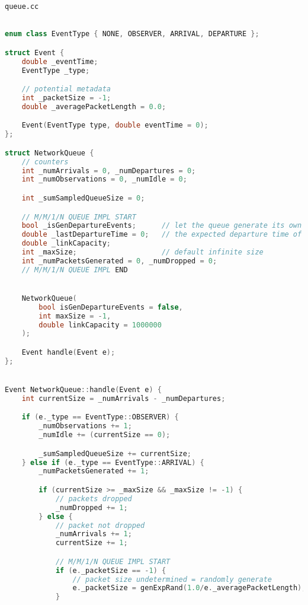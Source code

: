 \documentclass{article}
\begin{document}
\newpage

\texttt{queue.cc}
\begin{lstlisting}[language=C++,
                   directivestyle={\color{black}}
                   emph={int,char,double,float,unsigned},
                   emphstyle={\color{blue}}
                  ]

enum class EventType { NONE, OBSERVER, ARRIVAL, DEPARTURE };

struct Event {
    double _eventTime;
    EventType _type;

    // potential metadata
    int _packetSize = -1;
    double _averagePacketLength = 0.0;

    Event(EventType type, double eventTime = 0);
};

struct NetworkQueue {
    // counters
    int _numArrivals = 0, _numDepartures = 0;
    int _numObservations = 0, _numIdle = 0;

    int _sumSampledQueueSize = 0;

    // M/M/1/N QUEUE IMPL START
    bool _isGenDepartureEvents;      // let the queue generate its own departure events
    double _lastDepartureTime = 0;   // the expected departure time of the last packet in q
    double _linkCapacity;
    int _maxSize;                    // default infinite size
    int _numPacketsGenerated = 0, _numDropped = 0;
    // M/M/1/N QUEUE IMPL END


    NetworkQueue(
        bool isGenDepartureEvents = false,
        int maxSize = -1,
        double linkCapacity = 1000000
    );

    Event handle(Event e);
};


Event NetworkQueue::handle(Event e) {
    int currentSize = _numArrivals - _numDepartures;

    if (e._type == EventType::OBSERVER) {
        _numObservations += 1;
        _numIdle += (currentSize == 0);

        _sumSampledQueueSize += currentSize;
    } else if (e._type == EventType::ARRIVAL) {
        _numPacketsGenerated += 1;

        if (currentSize >= _maxSize && _maxSize != -1) {
            // packets dropped
            _numDropped += 1;
        } else {
            // packet not dropped
            _numArrivals += 1;
            currentSize += 1;

            // M/M/1/N QUEUE IMPL START
            if (e._packetSize == -1) {
                // packet size undetermined = randomly generate
                e._packetSize = genExpRand(1.0/e._averagePacketLength);
            }


\end{lstlisting}
\end{document}
